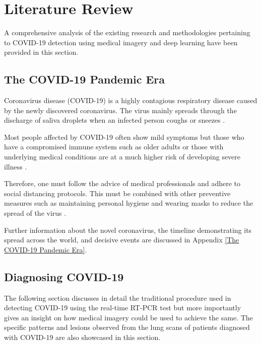 
\chapter{Literature Review} %

\label{ChapterX} %


A comprehensive analysis of the existing research and methodologies 
pertaining to COVID-19 detection using 
medical imagery and deep learning have been provided in this section.


\section{The COVID-19 Pandemic Era}

Coronavirus disease (COVID-19) is a highly contagious respiratory disease caused by the newly discovered coronavirus. 
The virus mainly spreads through the discharge of saliva droplets when an infected person coughs or sneezes \cite{WHO2020}.

Most people affected by COVID-19 often show mild symptoms but those who have a compromised immune system such as older adults or those with underlying medical conditions are at a much higher risk of developing severe illness \cite{CDC2020}.

Therefore, one must follow the advice of medical professionals and adhere to social distancing protocols. This must be combined with other preventive measures such as maintaining personal hygiene and wearing masks to reduce the spread of the virus \cite{CDCa2020}.

Further information about the novel coronavirus, the timeline demonstrating its spread across the world, and decisive events are discussed in Appendix \ref{The COVID-19 Pandemic Era}.

\section{Diagnosing COVID-19}
The following section discusses in detail the traditional procedure used 
in detecting COVID-19 using the real-time RT-PCR test but more importantly gives an insight on 
how medical imagery could be used to achieve the same. The specific patterns 
and lesions observed from the lung scans of patients diagnosed with COVID-19 are also showcased in this section.


